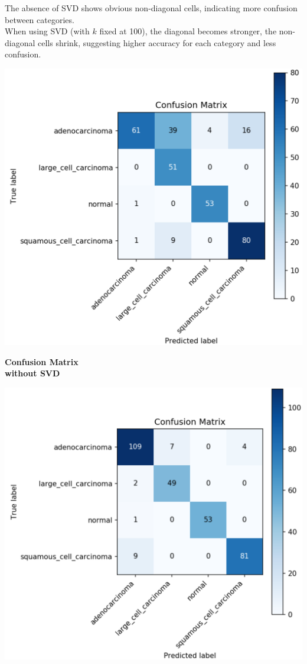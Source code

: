 \documentclass[a1paper,portrait,margin=0.8cm]{baposter}
\begin{document}
\begin{poster}
{\begin{minipage}[b]{0.175\textwidth}
\end{minipage}
\hfill
\begin{minipage}[b]{0.235\textwidth}

The absence of SVD shows obvious non-diagonal cells, indicating more confusion between categories.\\
When using SVD (with $k$ fixed at 100), the diagonal becomes stronger, the non-diagonal cells shrink, suggesting higher accuracy for each category and less confusion.

\centering
\includegraphics[width=0.95\linewidth]{confusion matrix.png} 

\vspace{-0.3em}
\textbf{Confusion Matrix \\ without SVD}
\vspace{0.7em}

\includegraphics[width=0.95\linewidth]{confusion matrix (svd).png} 


\end{minipage}}
\end{poster}
\end{document}
